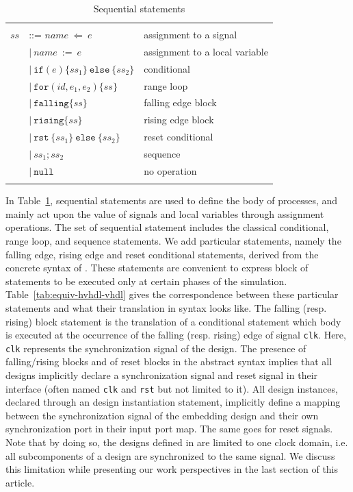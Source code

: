 \documentclass[pdflatex,sn-mathphys]{sn-jnl}%
\theoremstyle{thmstyleone}%
\theoremstyle{thmstyletwo}%
\theoremstyle{thmstylethree}%
\begin{document}
\begin{table}[!t]
  \caption{Sequential statements}
  \label{tab:ss}
  \begin{tabular}{|rll|}
    \hline
    & & \\
    $ss$ & ::= $name~\mathtt{\Leftarrow}~e$ & assignment to a signal \\
    & \quad$\vert{}~name~\mathtt{:=}~e$ & assignment to a local variable \\
    & \quad$\vert{}~\mathtt{if}(e)\{ss_1\}~\mathtt{else}~\{ss_2\}$ & conditional \\
    & \quad$\vert{}~\mathtt{for}(id,e_1,e_2)\{ss\}$ & range loop \\
    & \quad$\vert{}~\mathtt{falling}\{ss\}$ & falling edge block \\
    & \quad$\vert{}~\mathtt{rising}\{ss\}$ & rising edge block \\
    & \quad$\vert{}~\mathtt{rst}~\{ss_1\}~\mathtt{else}~\{ss_2\}$ & reset conditional \\
    & \quad$\vert{}~ss_1\mathtt{;}ss_2$ & sequence \\
    & \quad$\vert{}~\mathtt{null}$ & no operation \\
    & & \\
    \hline
  \end{tabular}
\end{table}

In Table~\ref{tab:ss}, sequential statements are used to define the
body of processes, and mainly act upon the value of signals and local
variables through assignment operations. The set of sequential
statement includes the classical conditional, range loop, and sequence
statements. We add particular statements, namely the falling edge,
rising edge and reset conditional statements, derived from the
concrete syntax of \vhdl{}.  These statements are convenient to
express block of statements to be executed only at certain phases of
the simulation. Table~\ref{tab:equiv-hvhdl-vhdl} gives the
correspondence between these particular \hvhdl{} statements and what
their translation in \vhdl{} syntax looks like. The falling
(resp. rising) block statement is the translation of a conditional
statement which body is executed at the occurrence of the falling
(resp. rising) edge of signal \texttt{clk}. Here, \texttt{clk}
represents the synchronization signal of the design. The presence of
falling/rising blocks and of reset blocks in the \hvhdl{} abstract
syntax implies that all \hvhdl{} designs implicitly declare a
synchronization signal and reset signal in their interface (often
named \texttt{clk} and \texttt{rst} but not limited to it). All design
instances, declared through an design instantiation statement,
implicitly define a mapping between the synchronization signal of the
embedding design and their own synchronization port in their input
port map. The same goes for reset signals. Note that by doing so, the
designs defined in \hvhdl{} are limited to one clock domain, i.e. all
subcomponents of a design are synchronized to the same signal. We
discuss this limitation while presenting our work perspectives in the
last section of this article.
\end{document}
